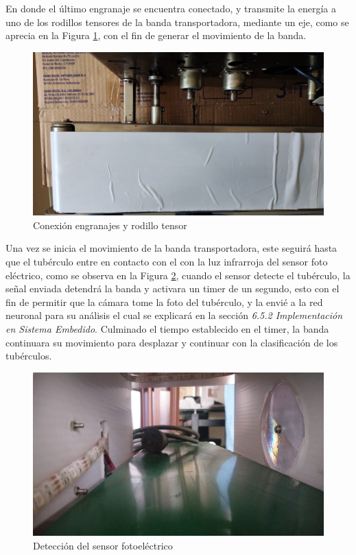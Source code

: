 		  En donde el último engranaje se encuentra conectado, y transmite la energía a uno de los rodillos tensores de la banda transportadora, mediante un eje, como se aprecia en la Figura \ref{fig:eje}, con el fin de generar el movimiento de la banda. 

		\begin{figure}[ht]
			\centering
			\includegraphics[angle=270, scale=0.21]{Figs/202.jpg}
			\caption{Conexión engranajes y rodillo tensor}
			\label{fig:eje}
		\end{figure}

	
		Una vez se inicia el movimiento de la banda transportadora, este seguirá hasta que el tubérculo entre en contacto con el con la luz infrarroja del sensor foto eléctrico, como se observa en la Figura \ref{fig:sensor}, cuando el sensor detecte el tubérculo, la señal enviada detendrá la banda y activara un timer de un segundo, esto con el fin de permitir que la cámara tome la foto del tubérculo, y la envié a la red neuronal para su análisis el cual se explicará en la sección \textit{6.5.2 Implementación en Sistema Embedido}. Culminado el tiempo establecido en el timer, la banda continuara su movimiento para desplazar y continuar con la clasificación de los tubérculos.
		
		\newpage
		\begin{figure}[ht]
			\centering
			\includegraphics[scale=0.15]{Figs/203.jpg}
			\caption{Detección del sensor fotoeléctrico}
			\label{fig:sensor}
		\end{figure}
	
